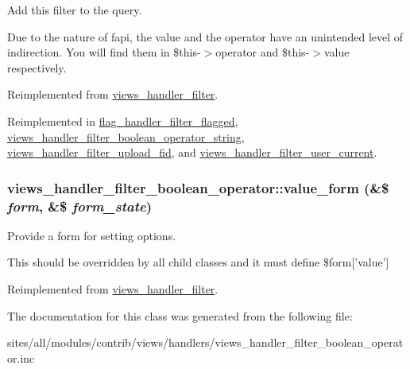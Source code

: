 Add this filter to the query.

Due to the nature of fapi, the value and the operator have an unintended level of indirection. You will find them in \$this-$>$operator and \$this-$>$value respectively. 

Reimplemented from \hyperlink{classviews__handler__filter_8e513b3abbc2559f37b550ca4957b4ae}{views\_\-handler\_\-filter}.

Reimplemented in \hyperlink{classflag__handler__filter__flagged_c01506ba4593bc1ab5b7b40f89843e82}{flag\_\-handler\_\-filter\_\-flagged}, \hyperlink{classviews__handler__filter__boolean__operator__string_d4d0444476749372e38591ad058ee1cd}{views\_\-handler\_\-filter\_\-boolean\_\-operator\_\-string}, \hyperlink{classviews__handler__filter__upload__fid_84a251fda29d367d7c915b736fe43b46}{views\_\-handler\_\-filter\_\-upload\_\-fid}, and \hyperlink{classviews__handler__filter__user__current_6002cf25d2385bd07c771f9a65cee48f}{views\_\-handler\_\-filter\_\-user\_\-current}.\hypertarget{classviews__handler__filter__boolean__operator_1680256640c960fef88ad1485cfb91f7}{
\subsubsection[{value\_\-form}]{\setlength{\rightskip}{0pt plus 5cm}views\_\-handler\_\-filter\_\-boolean\_\-operator::value\_\-form (\&\$ {\em form}, \/  \&\$ {\em form\_\-state})}}
\label{classviews__handler__filter__boolean__operator_1680256640c960fef88ad1485cfb91f7}


Provide a form for setting options.

This should be overridden by all child classes and it must define \$form\mbox{[}'value'\mbox{]} 

Reimplemented from \hyperlink{classviews__handler__filter_9168b39edae84b20e01a3fd0d810ba66}{views\_\-handler\_\-filter}.

The documentation for this class was generated from the following file:\begin{CompactItemize}
\item 
sites/all/modules/contrib/views/handlers/views\_\-handler\_\-filter\_\-boolean\_\-operator.inc\end{CompactItemize}
